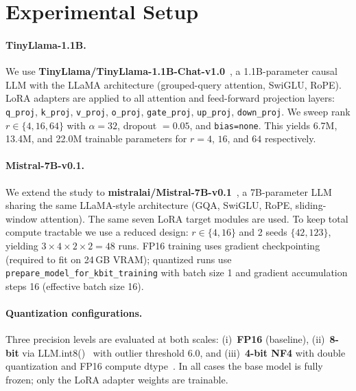 \documentclass{article}
\begin{document}
\section{Experimental Setup}

\paragraph{TinyLlama-1.1B.}
We use \textbf{TinyLlama/TinyLlama-1.1B-Chat-v1.0}~\citep{zhang2024tinyllama}, a
1.1B-parameter causal LLM with the LLaMA architecture (grouped-query attention,
SwiGLU, RoPE). LoRA adapters are applied to all attention and feed-forward
projection layers: \texttt{q\_proj}, \texttt{k\_proj}, \texttt{v\_proj},
\texttt{o\_proj}, \texttt{gate\_proj}, \texttt{up\_proj}, \texttt{down\_proj}. We
sweep rank $r \in \{4, 16, 64\}$ with $\alpha = 32$, dropout $= 0.05$, and
\texttt{bias=none}. This yields 6.7M, 13.4M, and 22.0M trainable parameters for
$r = 4$, $16$, and $64$ respectively.

\paragraph{Mistral-7B-v0.1.}
We extend the study to \textbf{mistralai/Mistral-7B-v0.1}~\citep{jiang2023mistral},
a 7B-parameter LLM sharing the same LLaMA-style architecture (GQA, SwiGLU, RoPE,
sliding-window attention). The same seven LoRA target modules are used. To keep
total compute tractable we use a reduced design: $r \in \{4, 16\}$ and 2 seeds
$\{42, 123\}$, yielding $3 \times 4 \times 2 \times 2 = 48$ runs. FP16 training
uses gradient checkpointing (required to fit on 24\,GB VRAM); quantized runs use
\texttt{prepare\_model\_for\_kbit\_training} with batch size 1 and gradient
accumulation steps 16 (effective batch size 16).

\paragraph{Quantization configurations.}
Three precision levels are evaluated at both scales: (i)~\textbf{FP16} (baseline),
(ii)~\textbf{8-bit} via LLM.int8()~\citep{dettmers2022llmint8} with outlier
threshold 6.0, and (iii)~\textbf{4-bit NF4} with double quantization and FP16
compute dtype~\citep{dettmers2023qlora}. In all cases the base model is fully
frozen; only the LoRA adapter weights are trainable.
\end{document}
